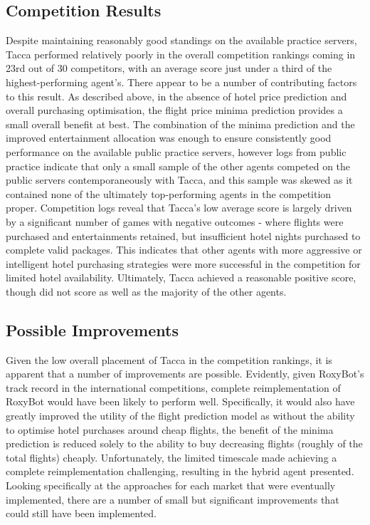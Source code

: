 \documentclass[oribibl]{llncs}
\begin{document}
\subsection{Competition Results}
Despite maintaining reasonably good standings on the available practice servers, Tacca performed relatively poorly in the overall competition rankings coming in 23rd out of 30 competitors, with an average score just under a third of the highest-performing agent's. %
There appear to be a number of contributing factors to this result. As described above, in the absence of hotel price prediction and overall purchasing optimisation, the flight price minima prediction provides a small overall benefit at best. The combination of the minima prediction and the improved entertainment allocation was enough to ensure consistently good performance on the available public practice servers, however logs from public practice indicate that only a small sample of the other agents competed on the public servers contemporaneously with Tacca, and this sample was skewed as it contained none of the ultimately top-performing agents in the competition proper. Competition logs reveal that Tacca's low average score is largely driven by a significant number of games with negative outcomes - where flights were purchased and entertainments retained, but insufficient hotel nights purchased to complete valid packages. This indicates that other agents with more aggressive or intelligent hotel purchasing strategies were more successful in the competition for limited hotel availability. Ultimately, Tacca achieved a reasonable positive score, though did not score as well as the majority of the other agents.

\subsection{Possible Improvements}
Given the low overall placement of Tacca in the competition rankings, it is apparent that a number of improvements are possible. Evidently, given RoxyBot's track record in the international competitions, complete reimplementation of RoxyBot would have been likely to perform well. Specifically, it would also have greatly improved the utility of the flight prediction model as without the ability to optimise hotel purchases around cheap flights, the benefit of the minima prediction is reduced solely to the ability to buy decreasing flights (roughly \textonequarter of the total flights) cheaply. Unfortunately, the limited timescale made achieving a complete reimplementation challenging, resulting in the hybrid agent presented. Looking specifically at the approaches for each market that were eventually implemented, there are a number of small but significant improvements that could still have been implemented.
\end{document}
